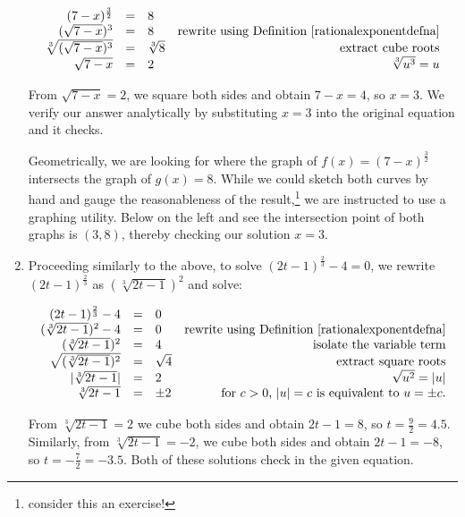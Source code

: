 \begin{ex}
\begin{enumerate}
\[ \begin{array}{rclr}

(7-x)^{\frac{3}{2}} & = & 8 & \\

(\sqrt{7-x})^3 & = & 8 & \text{rewrite using Definition \ref{rationalexponentdefna}} \\

\sqrt[3]{(\sqrt{7-x})^3} & = & \sqrt[3]{8} & \text{extract cube roots}  \\

\sqrt{7-x} & = & 2 & \text{$\sqrt[3]{u^3}= u$} \\ \end{array} \]

From $\sqrt{7-x} =  2$, we square both sides and obtain $7-x = 4$, so $x = 3$.  We verify our answer analytically by substituting $x=3$ into the original equation and it checks.

Geometrically, we are looking for where the graph of $f(x) = (7-x)^{\frac{3}{2}}$ intersects the graph of $g(x) = 8$.  While we could sketch both curves by hand and gauge the reasonableness of the result,\footnote{consider this an exercise!} we are instructed to use a graphing utility.  Below on the left and see the intersection point of both graphs is $(3,8)$, thereby checking our solution $x = 3$.

\item  Proceeding similarly to the above, to solve $(2t-1)^{\frac{2}{3}} -4 = 0$, we rewrite $(2t-1)^{\frac{2}{3}}$ as $(\sqrt[3]{2t-1})^2$ and solve:

\[ \begin{array}{rclr}
(2t-1)^{\frac{2}{3}} -4  & = & 0 & \\

(\sqrt[3]{2t-1})^2 - 4 & = & 0 & \text{rewrite using Definition \ref{rationalexponentdefna}} \\
(\sqrt[3]{2t-1})^2 & = & 4 & \text{isolate the variable term} \\

\sqrt{(\sqrt[3]{2t-1})^2 } & = & \sqrt{4} & \text{extract square roots} \\

|\sqrt[3]{2t-1}| & = & 2 & \text{$\sqrt{u^2} = |u|$} \\

\sqrt[3]{2t-1} & = & \pm 2 & \text{ for $c>0$, $|u| = c$ is equivalent to $u = \pm c$.} \end{array} \]

From $\sqrt[3]{2t-1}  = 2$ we cube both sides and obtain $2t-1 = 8$, so $t = \frac{9}{2} = 4.5$.  Similarly, from $\sqrt[3]{2t-1}  = -2$, we cube both sides and obtain $2t-1 = -8$, so $t = -\frac{7}{2} = -3.5$.  Both of these solutions check in the given equation.


\end{enumerate}
\end{ex}
